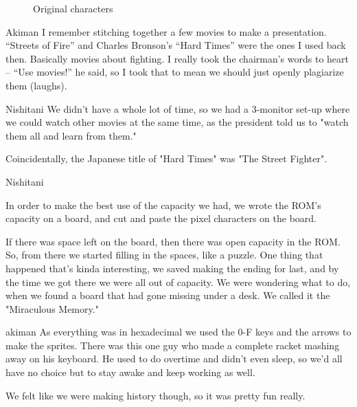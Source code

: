 \begin{figure}[H]
\caption*{Original characters}
\end{figure}

\begin{q}{Akiman\cite{ffdevinterview}}
I remember stitching together a few movies to make a presentation. “Streets of Fire” and Charles Bronson’s “Hard Times” were the ones I used back then. Basically movies about fighting. I really took the chairman’s words to heart – “Use movies!” he said, so I took that to mean we should just openly plagiarize them (laughs).
\end{q}

\begin{q}{Nishitani\cite{ffdevinterview}}
We didn't have a whole lot of time, so we had a 3-monitor set-up where we could watch other movies at the same time, as the president told us to "watch them all and learn from them."
\end{q}

Coincidentally, the Japanese title of "Hard Times" was "The Street Fighter".


\pagebreak

\begin{q}{Nishitani\cite{ffdevinterview}}
  
In order to make the best use of the capacity we had, we wrote the ROM's capacity on a board, and cut and paste the pixel characters on the board.
 
If there was space left on the board, then there was open capacity in the ROM. So, from there we started filling in the spaces, like a puzzle. One thing that happened that's kinda interesting, we saved making the ending for last, and by the time we got there we were all out of capacity. We were wondering what to do, when we found a board that had gone missing under a desk. We called it the "Miraculous Memory."


\end{q}

\pagebreak

\pagebreak

\pagebreak

\pagebreak

\pagebreak

\begin{q}{akiman\cite{ar20160404}}
  As everything was in hexadecimal we used the 0-F keys and the arrows to make the sprites. There was this one guy who made a complete racket mashing away on his keyboard. He used to do overtime and didn't even sleep, so we'd all have no choice but to stay awake and keep working as well.

   We felt like we were making history though, so it was pretty fun really.
\end{q}


